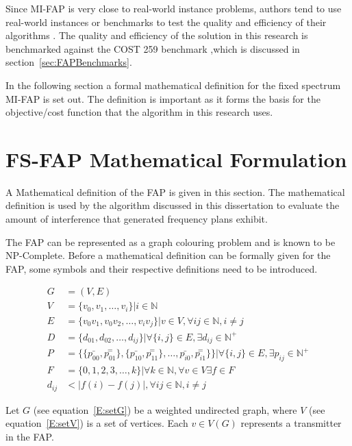Since \gls{MI-FAP} is very close to real-world instance problems, authors tend to use real-world instances or benchmarks to test the quality and efficiency of their algorithms \cite{Eisenblatter,MontemanniThesis}. The quality and efficiency of the solution in this research is benchmarked against the \gls{COST} 259 benchmark ,which is discussed in section~\ref{sec:FAPBenchmarks}.

In the following section a formal mathematical definition for the fixed spectrum \gls{MI-FAP} is set out. The definition is important as it forms the basis for the objective/cost function that the algorithm in this research uses.
 
\section{\gls{FS-FAP} Mathematical Formulation}
\label{sec:FAPMathDef}
A Mathematical definition of the \gls{FAP} is given in this section. The mathematical definition is used by the algorithm discussed in this dissertation to evaluate the amount of interference that generated frequency plans exhibit.

The \gls{FAP} can be represented as a graph colouring problem and is known to be NP-Complete. Before a mathematical definition can be formally given for the \gls{FAP}, some symbols and their respective definitions need to be introduced.

\begin{align}
	G &= (V,E) \label{E:setG}\\
	V &= \{v_{0},v_{1},\ldots,v_{i}\} | i \in \mathbb{N} \label{E:setV}\\
	E &= \{v_0v_1,v_0v_2,\ldots,v_iv_j\}|v \in V,\forall ij \in \mathbb{N},i \neq j \label{E:setE}\\
	D &= \{d_{01},d_{02},\ldots,d_{ij}\}| \forall\{i,j\} \in E, \exists d_{ij} \in \mathbb{N}^+ \label{E:setD}\\
	P &= \{\{\bar{p_{00}},\overset{=}{p_{01}}\},\{\bar{p_{10}},\overset{=}{p_{11}}\},\ldots,\bar{p_{i0}},\overset{=}{p_{i1}}\}\}| \forall \{i,j\} \in E,\exists p_{ij} \in \mathbb{N}^+ \label{E:setP}\\
	F &= \{0,1,2,3,\ldots,k\}| \forall k \in \mathbb{N},\forall v \in V \exists f \in F\label{E:setF}\\
	d_{ij} &< |f(i) - f(j)|, \forall ij \in \mathbb{N},i \neq j \label{E:interference}
\end{align}

Let $G$ (see equation~\ref{E:setG}) be a weighted undirected graph, where $V$ (see equation~\ref{E:setV}) is a set of vertices\cite{MontemanniThesis}. Each $v \in V(G)$ represents a transmitter in the \gls{FAP}\cite{MontemanniThesis}. 

